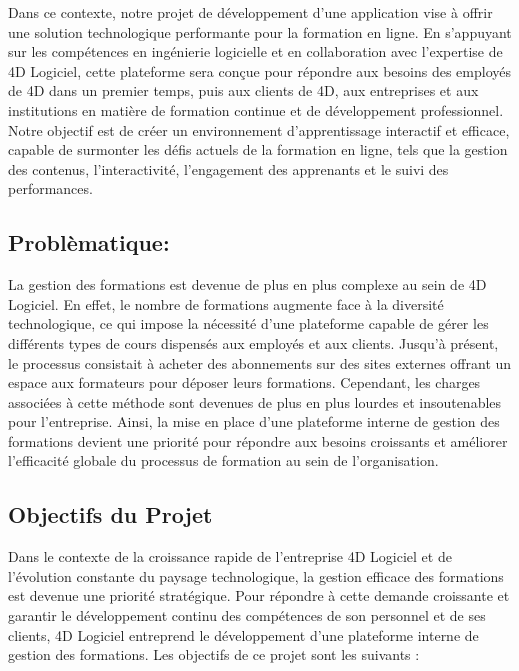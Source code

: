  Dans ce contexte, notre projet de développement d'une application vise à offrir une solution technologique performante pour la formation en ligne. En s'appuyant sur les compétences en ingénierie logicielle et en collaboration avec l'expertise de 4D Logiciel, cette plateforme sera conçue pour répondre aux besoins des employés de 4D dans un premier temps, puis aux clients de 4D, aux entreprises et aux institutions en matière de formation continue et de développement professionnel. Notre objectif est de créer un environnement d'apprentissage interactif et efficace, capable de surmonter les défis actuels de la formation en ligne, tels que la gestion des contenus, l'interactivité, l'engagement des apprenants et le suivi des performances.

 \subsection{Problèmatique:}

 La gestion des formations est devenue de plus en plus complexe au sein de 4D Logiciel. En effet, le nombre de formations augmente face à la diversité technologique, ce qui impose la nécessité d’une plateforme capable de gérer les différents types de cours dispensés aux employés et aux clients.  Jusqu'à présent, le processus consistait à acheter des abonnements sur des sites externes offrant un espace aux formateurs pour déposer leurs formations. Cependant, les charges associées à cette méthode sont devenues de plus en plus lourdes et insoutenables pour l'entreprise. Ainsi, la mise en place d'une plateforme interne de gestion des formations devient une priorité pour répondre aux besoins croissants et améliorer l'efficacité globale du processus de formation au sein de l'organisation.
 
 \subsection{Objectifs du Projet}

Dans le contexte de la croissance rapide de l'entreprise 4D Logiciel et de l'évolution constante du paysage technologique, la gestion efficace des formations est devenue une priorité stratégique. Pour répondre à cette demande croissante et garantir le développement continu des compétences de son personnel et de ses clients, 4D Logiciel entreprend le développement d'une plateforme interne de gestion des formations. Les objectifs de ce projet sont les suivants :

